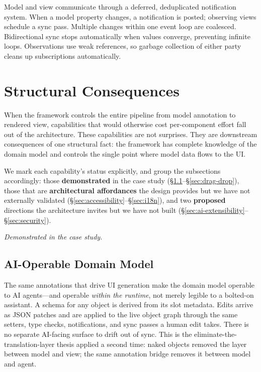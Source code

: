 \documentclass[sigplan,review,anonymous,10pt]{acmart}
\begin{document}
Model and view communicate through a deferred, deduplicated notification system. When a model property changes, a notification is posted; observing views schedule a sync pass. Multiple changes within one event loop are coalesced. Bidirectional sync stops automatically when values converge, preventing infinite loops. Observations use weak references, so garbage collection of either party cleans up subscriptions automatically.

\section{Structural Consequences}
\label{sec:consequences}

When the framework controls the entire pipeline from model annotation to rendered view, capabilities that would otherwise cost per-component effort fall out of the architecture. These capabilities are not surprises. They are downstream consequences of one structural fact: the framework has complete knowledge of the domain model and controls the single point where model data flows to the UI.

We mark each capability's status explicitly, and group the subsections accordingly: those \textbf{demonstrated} in the case study (\S\ref{sec:ai-operable}--\S\ref{sec:drag-drop}), those that are \textbf{architectural affordances} the design provides but we have not externally validated (\S\ref{sec:accessibility}--\S\ref{sec:i18n}), and two \textbf{proposed} directions the architecture invites but we have not built (\S\ref{sec:ai-extensibility}--\S\ref{sec:security}).

\medskip\noindent\textit{Demonstrated in the case study.}

\subsection{AI-Operable Domain Model}
\label{sec:ai-operable}

The same annotations that drive UI generation make the domain model operable to AI agents---and operable \emph{within the runtime}, not merely legible to a bolted-on assistant. A schema for any object is derived from its slot metadata. Edits arrive as JSON patches and are applied to the live object graph through the same setters, type checks, notifications, and sync passes a human edit takes. There is no separate AI-facing surface to drift out of sync. This is the eliminate-the-translation-layer thesis applied a second time: naked objects removed the layer between model and view; the same annotation bridge removes it between model and agent.
\end{document}

